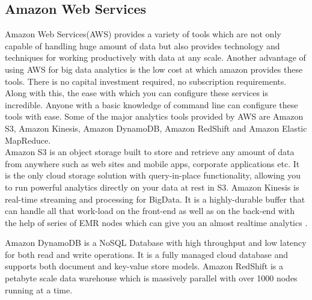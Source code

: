 \documentclass[sigconf]{acmart}
\begin{document}
\subsection{Amazon Web Services}
Amazon Web Services(AWS) provides a variety of tools which are not only capable of handling huge amount of data but also provides technology and techniques for working productively with data at any scale. Another advantage of using AWS for big data analytics is the low cost at which amazon provides these tools. There is no capital investment required, no subscription requirements. Along with this, the ease with which you can configure these services is incredible. Anyone with a basic knowledge of command line can configure these tools with ease. Some of the major analytics tools provided by AWS are Amazon S3, Amazon Kinesis, Amazon DynamoDB, Amazon RedShift and Amazon Elastic MapReduce.  \\
Amazon S3 is an object storage built to store and retrieve any amount of data from anywhere such as web sites and mobile apps, corporate applications etc. It is the only cloud storage solution with query-in-place functionality, allowing you to run powerful analytics directly on your data at rest in S3.\cite{S3}
Amazon Kinesis is real-time streaming and processing for BigData. It is a highly-durable buffer that can handle all that work-load on the front-end as well as on the back-end with the help of series of EMR nodes which can give you an almost realtime analytics \cite{kinesis}.

Amazon DynamoDB is a NoSQL Database with high throughput and low latency for both read and write operations. It is a fully managed cloud database and supports both document and key-value store models. 
Amazon RedShift is a petabyte scale data warehouse which is massively parallel with over 1000 nodes running at a time.
\end{document}
